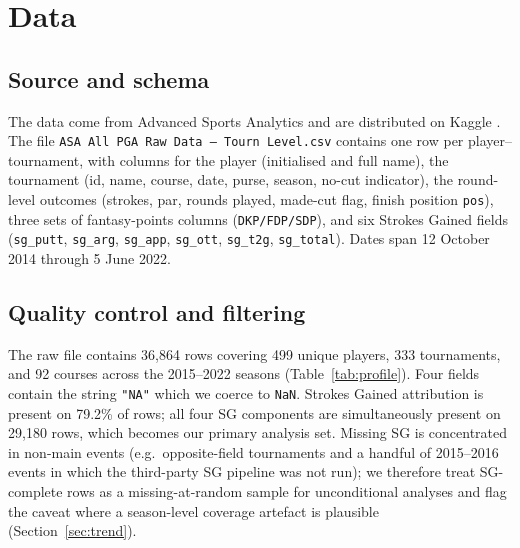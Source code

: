 \documentclass[11pt]{article}
\begin{document}
\section{Data}
\label{sec:data}

\subsection{Source and schema}

The data come from Advanced Sports Analytics \citep{asa_pga_source} and are distributed on Kaggle \citep{kaggle_asa_pga}.  The file \texttt{ASA All PGA Raw Data -- Tourn Level.csv} contains one row per player--tournament, with columns for the player (initialised and full name), the tournament (id, name, course, date, purse, season, no-cut indicator), the round-level outcomes (strokes, par, rounds played, made-cut flag, finish position \texttt{pos}), three sets of fantasy-points columns (\texttt{DKP/FDP/SDP}), and six Strokes Gained fields (\texttt{sg\_putt}, \texttt{sg\_arg}, \texttt{sg\_app}, \texttt{sg\_ott}, \texttt{sg\_t2g}, \texttt{sg\_total}).  Dates span 12 October 2014 through 5 June 2022.

\subsection{Quality control and filtering}

The raw file contains 36{,}864 rows covering 499 unique players, 333 tournaments, and 92 courses across the 2015--2022 seasons (Table~\ref{tab:profile}).  Four fields contain the string \texttt{"NA"} which we coerce to \texttt{NaN}.  Strokes Gained attribution is present on 79.2\% of rows; all four SG components are simultaneously present on 29{,}180 rows, which becomes our primary analysis set.  Missing SG is concentrated in non-main events (e.g.\ opposite-field tournaments and a handful of 2015--2016 events in which the third-party SG pipeline was not run); we therefore treat SG-complete rows as a missing-at-random sample for unconditional analyses and flag the caveat where a season-level coverage artefact is plausible (Section~\ref{sec:trend}).
\end{document}
